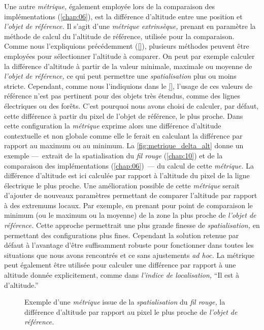 Une autre \emph{métrique,} également employée lors de la comparaison
des implémentations (\autoref{chap:06}), est la différence d'altitude
entre une position et \emph{l'objet de référence.} Il s'agit d'une
\emph{métrique extrinsèque,} prenant en paramètre la méthode de calcul
du l'altitude de référence, utilisée pour la comparaison. Comme nous
l'expliquions précédemment (\autoref{}), plusieurs méthodes peuvent
être employées pour sélectionner l'altitude à comparer. On peut par
exemple calculer la différence d'altitude à partir de la valeur
minimale, maximale ou moyenne de \emph{l'objet de référence,} ce qui
peut permettre une \emph{spatialisation} plus ou moins
stricte. Cependant, comme nous l'indiquions dans le \autoref{},
l'usage de ces valeurs de référence n'est pas pertinent pour des
objets très étendus, comme des lignes électriques ou des forêts. C'est
pourquoi nous avons choisi de calculer, par défaut, cette différence à
partir du pixel de l'objet de référence, le plus proche. Dans cette
configuration la \emph{métrique}  exprime alors une
différence d'altitude contextuelle et non globale comme elle le ferait
en calculant la différence par rapport au maximum ou au minimum. La
\autoref{fig:metrique_delta_alt} donne un exemple ---~extrait de la
spatialisation du \emph{fil rouge} (\autoref{chap:10}) et de la
comparaison des implémentations (\autoref{chap:06})~--- du calcul de
cette \emph{métrique.} La différence d'altitude est ici calculée par
rapport à l'altitude du pixel de la ligne électrique le plus
proche. Une amélioration possible de cette \emph{métrique} serait
d'ajouter de nouveaux paramètres permettant de comparer l'altitude par
rapport à des extremums locaux. Par exemple, en prenant pour point de
comparaison le minimum (ou le maximum ou la moyenne) de la zone la
plus proche de \emph{l'objet de référence.} Cette approche permettrait
une plus grande finesse de \emph{spatialisation,} en permettant des
configurations plus fines. Cependant la solution retenue par défaut à
l'avantage d'être suffisamment robuste pour fonctionner dans toutes
les situations que nous avons rencontrés et ce sans ajustements
\emph{ad hoc.} La métrique  peut également être
utilisée pour calculer une différence par rapport à une altitude
donnée explicitement, comme dans \emph{l'indice de localisation,}
\enquote{Il est à  d'altitude.}

\begin{figure}
  \centering
  
  \caption{Exemple d'une \emph{métrique} issue de la
    \emph{spatialisation} du \emph{fil rouge,} la différence
    d'altitude par rapport au pixel le plus proche de \emph{l'objet de
      référence.}}
  \label{fig:metrique_delta_alt}
\end{figure}

